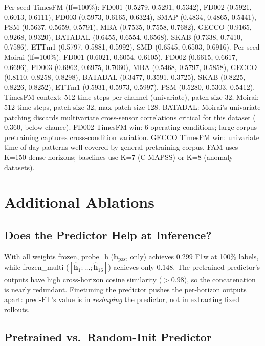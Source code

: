 \documentclass{article}
\newcommand{\h}{\mathbf{h}}
\begin{document}
\begin{table}[h]
  \begin{minipage}{\linewidth}
    \scriptsize
    Per-seed TimesFM (lf=100\%): FD001 (0.5279, 0.5291, 0.5342), FD002 (0.5921, 0.6013, 0.6111), FD003 (0.5973, 0.6165, 0.6324), SMAP (0.4834, 0.4865, 0.5441), PSM (0.5637, 0.5659, 0.5791), MBA (0.7535, 0.7558, 0.7682), GECCO (0.9165, 0.9268, 0.9320), BATADAL (0.6455, 0.6554, 0.6568), SKAB (0.7338, 0.7410, 0.7586), ETTm1 (0.5797, 0.5881, 0.5992), SMD (0.6545, 0.6503, 0.6916).
    Per-seed Moirai (lf=100\%): FD001 (0.6021, 0.6054, 0.6105), FD002 (0.6615, 0.6617, 0.6696), FD003 (0.6962, 0.6975, 0.7060), MBA (0.5468, 0.5797, 0.5858), GECCO (0.8110, 0.8258, 0.8298), BATADAL (0.3477, 0.3591, 0.3725), SKAB (0.8225, 0.8226, 0.8252), ETTm1 (0.5931, 0.5973, 0.5997), PSM (0.5280, 0.5303, 0.5412).
    TimesFM context: 512 time steps per channel (univariate), patch size 32; Moirai: 512 time steps, patch size 32, max patch size 128.
    BATADAL: Moirai's univariate patching discards multivariate cross-sensor correlations critical for this dataset ($0.360$, below chance).
    FD002 TimesFM win: 6 operating conditions; large-corpus pretraining captures cross-condition variation. GECCO TimesFM win: univariate time-of-day patterns well-covered by general pretraining corpus.
    FAM uses K=150 dense horizons; baselines use K=7 (C-MAPSS) or K=8 (anomaly datasets).
  \end{minipage}
\end{table}

\section{Additional Ablations}
\label{app:additional_ablations}

\subsection{Does the Predictor Help at Inference?}
\label{app:predictor_ablation}

With all weights frozen, probe\_h ($\h_\text{past}$ only) achieves $0.299$ F1w at 100\% labels, while frozen\_multi ($[\hat{\h}_1;\ldots;\hat{\h}_{16}]$) achieves only $0.148$. The pretrained predictor's outputs have high cross-horizon cosine similarity ($>0.98$), so the concatenation is nearly redundant. Finetuning the predictor pushes the per-horizon outputs apart: pred-FT's value is in \emph{reshaping} the predictor, not in extracting fixed rollouts.

\subsection{Pretrained vs.\ Random-Init Predictor}
\label{app:predictor_pretrain_ablation}
\end{document}
